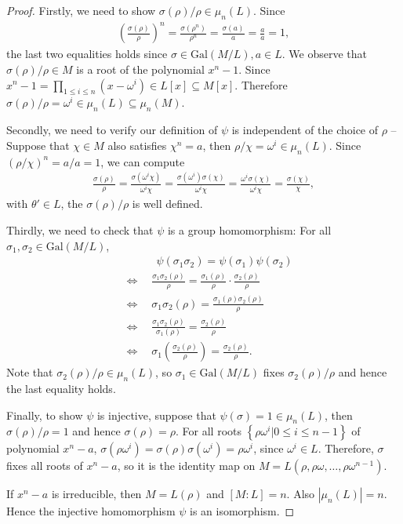 \begin{proof}
Firstly, we need to show \(\sigma(\rho)/ \rho \in \mu_n(L)\). Since \begin{align*}
    \left(\frac{\sigma(\rho)}{\rho} \right)^n = \frac{\sigma(\rho^n)}{\rho^n} = \frac{\sigma(a)}{a} = \frac{a}{a} = 1,
\end{align*}  
the last two equalities holds since \(\sigma \in \mathrm{Gal}(M/L), a \in L\). We observe that \(\sigma(\rho)/\rho \in M\) is a root of the polynomial \(x^n -1\). Since \(x^n -1 = \displaystyle\prod_{1 \leq i \leq n} (x-\omega^i) \in L[x] \subseteq M[x]\).  Therefore \( \sigma(\rho)/\rho = \omega^i \in \mu_n(L) \subseteq \mu_n(M)\).

Secondly, we need to verify our definition of $\psi$ is independent of the choice of \(\rho\) -- Suppose that \(\chi \in M\) also satisfies \(\chi^n = a\), then \(\rho/ \chi = \omega^i \in \mu_n(L)\). Since \((\rho/\chi)^n = a/a =1\), we can compute
\begin{align*}
    \frac{\sigma(\rho)}{\rho} = \frac{\sigma(\omega^i \chi)}{\omega^i \chi} = \frac{\sigma(\omega^i)\sigma(\chi)}{\omega^i\chi} = \frac{\omega^i\sigma(\chi)}{\omega^i\chi} = \frac{\sigma(\chi)}{\chi},
\end{align*}
with \(\theta' \in L\), the \(\sigma(\rho)/\rho\) is well defined.

Thirdly, we need to check that \(\psi\) is a group homomorphism: For all \(\sigma_1 , \sigma_2 \in \mathrm{Gal}(M/L)\),
\begin{align*}
     & \quad \quad \quad \psi(\sigma_1 \sigma_2) = \psi(\sigma_1) \psi(\sigma_2)\\
     &\Leftrightarrow \quad\frac{\sigma_1\sigma_2(\rho)}{\rho} = \frac{\sigma_1(\rho)}{\rho} \cdot\frac{\sigma_2(\rho)}{\rho}\\
    &\Leftrightarrow \quad  \sigma_1 \sigma_2(\rho) = \frac{\sigma_1(\rho) \sigma_2(\rho)}{\rho}\\
     &\Leftrightarrow \quad \frac{\sigma_1 \sigma_2(\rho)}{\sigma_1(\rho)} = \frac{\sigma_2(\rho)}{\rho}\\
   &\Leftrightarrow \quad 
\sigma_1\left(\frac{\sigma_2(\rho)}{\rho}\right) = \frac{\sigma_2(\rho)}{\rho}.
\end{align*}
Note that \(\sigma_2(\rho)/\rho \in \mu_n(L)\), so \(\sigma_1\in \mathrm{Gal}(M/L)\) fixes \(\sigma_2(\rho)/\rho\) and hence the last equality holds.

Finally, to show \(\psi\) is injective, suppose that \(\psi(\sigma) = 1 \in \mu_n(L)\), then \(\sigma(\rho)/\rho = 1\) and hence \(\sigma(\rho) = \rho\). For all roots \(\left\{ \rho \omega^i| 0 \leq i \leq n-1\right\}\) of polynomial \(x^n -a\), \(\sigma(\rho \omega^i) = \sigma(\rho) \sigma(\omega^i) = \rho \omega^i\), since \(\omega^i \in L\). Therefore, \(\sigma\) fixes all roots of \(x^n-a\), so it is the identity map on \(M=L(\rho,\rho\omega,\dots,\rho\omega^{n-1})\).

If $x^n-a$ is irreducible, then $M=L(\rho)$ and $[M:L]=n$. Also $|\mu_n(L)|=n$. Hence the injective homomorphism $\psi$ is an isomorphism.
\end{proof}

